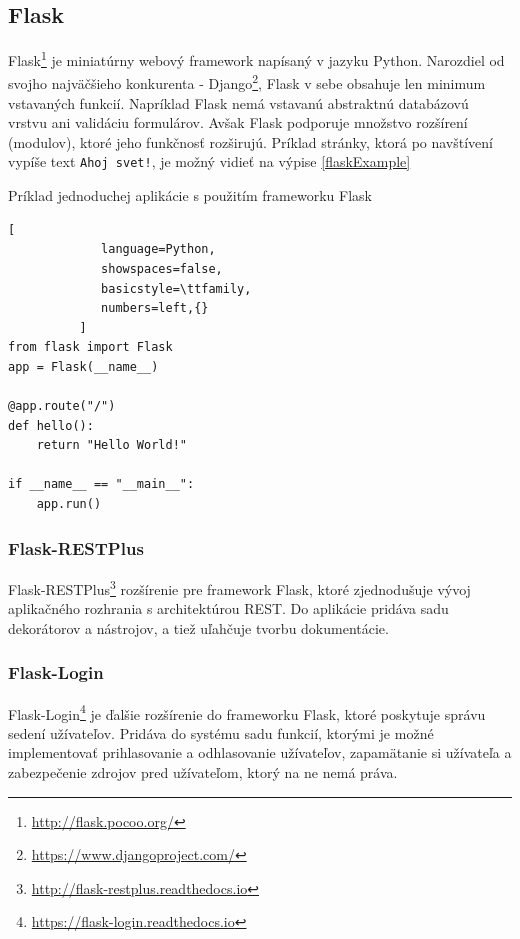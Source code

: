\documentclass[slovak]{fitthesis}
\begin{document}
\subsection{Flask}\label{flask}
Flask\footnote{\url{http://flask.pocoo.org/}} je miniatúrny webový framework napísaný v jazyku Python. Narozdiel od svojho najväčšieho konkurenta - Django\footnote{\url{https://www.djangoproject.com/}}, Flask v sebe obsahuje len minimum vstavaných funkcií. Napríklad Flask nemá vstavanú abstraktnú databázovú vrstvu ani validáciu formulárov. Avšak Flask podporuje množstvo rozšírení (modulov), ktoré jeho funkčnosť rozširujú. Príklad stránky, ktorá po navštívení vypíše text \texttt{Ahoj svet!}, je možný vidieť na výpise \ref{flaskExample}



\begin{algorithm}[H]
  \caption{Príklad jednoduchej aplikácie s použitím frameworku Flask}
  \label{flaskExample}
  \begin{lstlisting}[
             language=Python,
             showspaces=false,
             basicstyle=\ttfamily,
             numbers=left,{}
          ]
from flask import Flask
app = Flask(__name__)

@app.route("/")
def hello():
    return "Hello World!"

if __name__ == "__main__":
    app.run()
  \end{lstlisting}
\end{algorithm}

\subsubsection{Flask-RESTPlus}\label{RestPlusFlask}
Flask-RESTPlus\footnote{\url{http://flask-restplus.readthedocs.io}} rozšírenie pre framework Flask, ktoré zjednodušuje vývoj aplikačného rozhrania s architektúrou REST. Do aplikácie pridáva sadu dekorátorov a nástrojov, a tiež uľahčuje tvorbu dokumentácie.

\subsubsection{Flask-Login}\label{Flask login}
Flask-Login\footnote{\url{https://flask-login.readthedocs.io}} je ďalšie rozšírenie do frameworku Flask, ktoré poskytuje správu sedení užívateľov. Pridáva do systému sadu funkcií, ktorými je možné implementovať prihlasovanie a odhlasovanie užívateľov, zapamätanie si užívateľa a zabezpečenie zdrojov pred užívateľom, ktorý na ne nemá práva.
\end{document}
